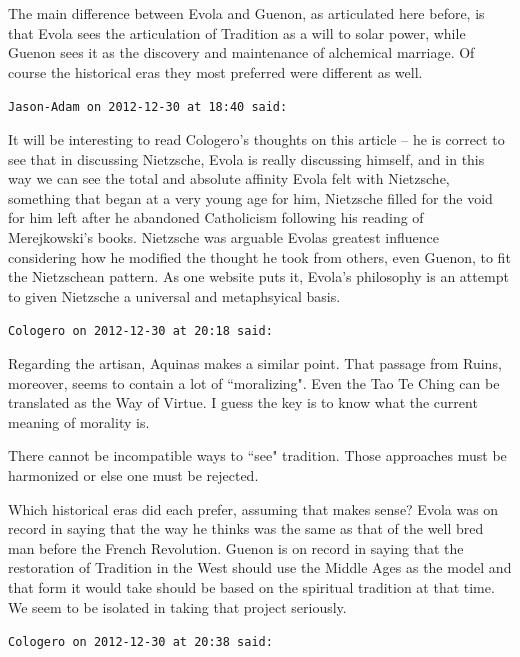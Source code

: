 \begin{footnotesize}
\begin{sffamily}
The main difference between Evola and Guenon, as articulated here before, is that Evola sees the articulation of Tradition as a will to solar power, while Guenon sees it as the discovery and maintenance of alchemical marriage. Of course the historical eras they most preferred were different as well.


\hfill

\texttt{Jason-Adam on 2012-12-30 at 18:40 said: }

It will be interesting to read Cologero's thoughts on this article – he is correct to see that in discussing Nietzsche, Evola is really discussing himself, and in this way we can see the total and absolute affinity Evola felt with Nietzsche, something that began at a very young age for him, Nietzsche filled for the void for him left after he abandoned Catholicism following his reading of Merejkowski's books. Nietzsche was arguable Evolas greatest influence considering how he modified the thought he took from others, even Guenon, to fit the Nietzschean pattern. As one website puts it, Evola's philosophy is an attempt to given Nietzsche a universal and metaphsyical basis.


\hfill

\texttt{Cologero on 2012-12-30 at 20:18 said: }

Regarding the artisan, Aquinas makes a similar point. That passage from Ruins, moreover, seems to contain a lot of ``moralizing". Even the Tao Te Ching can be translated as the Way of Virtue. I guess the key is to know what the current meaning of morality is.

There cannot be incompatible ways to ``see" tradition. Those approaches must be harmonized or else one must be rejected.

Which historical eras did each prefer, assuming that makes sense? Evola was on record in saying that the way he thinks was the same as that of the well bred man before the French Revolution. Guenon is on record in saying that the restoration of Tradition in the West should use the Middle Ages as the model and that form it would take should be based on the spiritual tradition at that time. We seem to be isolated in taking that project seriously.


\hfill

\texttt{Cologero on 2012-12-30 at 20:38 said: }


\end{sffamily}
\end{footnotesize}
